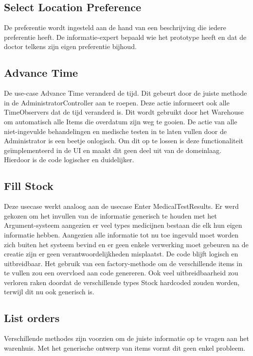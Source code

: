 \subsection{Select Location Preference}
De preferentie wordt ingesteld aan de hand van een beschrijving die iedere preferentie heeft. 
De informatie-expert bepaald wie het prototype heeft en dat de doctor telkens zijn eigen preferentie bijhoud.

\subsection{Advance Time}
De use-case Advance Time veranderd de tijd. Dit gebeurt door de juiste methode in de AdministratorController aan te roepen. 
Deze actie informeert ook alle TimeObservers dat de tijd veranderd is. Dit wordt gebruikt door het Warehouse om automatisch alle Items die overdatum zijn weg te gooien. 
De actie van alle niet-ingevulde behandelingen en medische testen in te laten vullen door de Administrator is een beetje onlogisch. 
Om dit op te lossen is deze functionaliteit geïmplementeerd in de UI en maakt dit geen deel uit van de domeinlaag. 
Hierdoor is de code logischer en duidelijker.

\subsection{Fill Stock}
Deze usecase werkt analoog aan de usecase Enter MedicalTestResults. 
Er werd gekozen om het invullen van de informatie generisch te houden met het Argument-systeem aangezien er veel types medicijnen bestaan die elk hun eigen informatie hebben. 
Aangezien alle informatie tot nu toe ingevuld moet worden zich buiten het systeem bevind en er geen enkele verwerking moet gebeuren na de creatie zijn er geen verantwoordelijkheden misplaatst.
De code blijft logisch en uitbreidbaar. Het gebruik van een factory-methode om de verschillende items in te vullen zou een overvloed aan code genereren. 
Ook veel uitbreidbaarheid zou verloren raken doordat de verschillende types Stock hardcoded zouden worden, terwijl dit nu ook generisch is.

\subsection{List orders}
Verschillende methodes zijn voorzien om de juiste informatie op te vragen aan het warenhuis. Met het generische ontwerp van items vormt dit geen enkel probleem.

